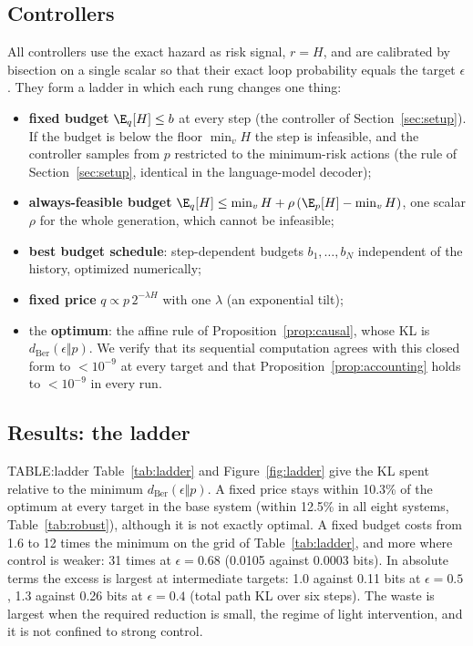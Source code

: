 \subsection{Controllers}
All controllers use the exact hazard as risk signal, $r=H$, and are calibrated by bisection on a single scalar so that their exact loop probability equals the target $\epsilon$. They form a ladder in which each rung changes one thing:
\begin{itemize}[leftmargin=*,itemsep=1pt]
\item \textbf{fixed budget} $\E_q[H]\le b$ at every step (the controller of Section~\ref{sec:setup}). If the budget is below the floor $\min_vH$ the step is infeasible, and the controller samples from $p$ restricted to the minimum-risk actions (the rule of Section~\ref{sec:setup}, identical in the language-model decoder);
\item \textbf{always-feasible budget} $\E_q[H]\le \min_v H+\rho\,(\E_p[H]-\min_v H)$, one scalar $\rho$ for the whole generation, which cannot be infeasible;
\item \textbf{best budget schedule}: step-dependent budgets $b_1,\dots,b_N$ independent of the history, optimized numerically;
\item \textbf{fixed price} $q\propto p\,2^{-\lambda H}$ with one $\lambda$ (an exponential tilt);
\item the \textbf{optimum}: the affine rule of Proposition~\ref{prop:causal}, whose KL is $d_{\mathrm{Ber}}(\epsilon\Vert p)$. We verify that its sequential computation agrees with this closed form to $<10^{-9}$ at every target and that Proposition~\ref{prop:accounting} holds to $<10^{-9}$ in every run.
\end{itemize}

\subsection{Results: the ladder}\label{ssec:ladder}
{{TABLE:ladder}}
Table~\ref{tab:ladder} and Figure~\ref{fig:ladder} give the KL spent relative to the minimum $d_{\mathrm{Ber}}(\epsilon\Vert p)$. A fixed price stays within 10.3\% of the optimum at every target in the base system (within 12.5\% in all eight systems, Table~\ref{tab:robust}), although it is not exactly optimal. A fixed budget costs from 1.6 to 12 times the minimum on the grid of Table~\ref{tab:ladder}, and more where control is weaker: 31 times at $\epsilon=0.68$ (0.0105 against 0.0003 bits). In absolute terms the excess is largest at intermediate targets: 1.0 against 0.11 bits at $\epsilon=0.5$, 1.3 against 0.26 bits at $\epsilon=0.4$ (total path KL over six steps). The waste is largest when the required reduction is small, the regime of light intervention, and it is not confined to strong control.

